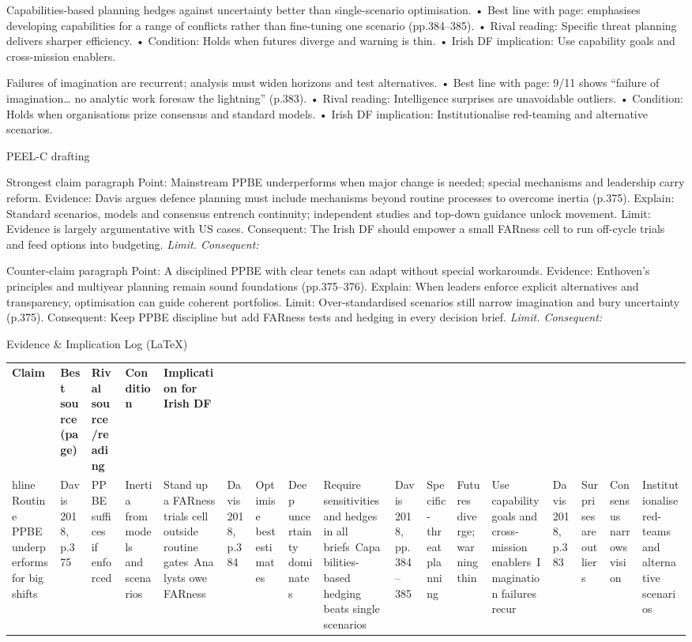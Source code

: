 Capabilities-based planning hedges against uncertainty better than single-scenario optimisation.
• Best line with page: emphasises developing capabilities for a range of conflicts rather than fine-tuning one scenario (pp.384–385).
• Rival reading: Specific threat planning delivers sharper efficiency.
• Condition: Holds when futures diverge and warning is thin.
• Irish DF implication: Use capability goals and cross-mission enablers.

Failures of imagination are recurrent; analysis must widen horizons and test alternatives.
• Best line with page: 9/11 shows “failure of imagination… no analytic work foresaw the lightning” (p.383).
• Rival reading: Intelligence surprises are unavoidable outliers.
• Condition: Holds when organisations prize consensus and standard models.
• Irish DF implication: Institutionalise red-teaming and alternative scenarios.

PEEL-C drafting

Strongest claim paragraph
Point: Mainstream PPBE underperforms when major change is needed; special mechanisms and leadership carry reform.
Evidence: Davis argues defence planning must include mechanisms beyond routine processes to overcome inertia (p.375).
Explain: Standard scenarios, models and consensus entrench continuity; independent studies and top-down guidance unlock movement.
Limit: Evidence is largely argumentative with US cases.
Consequent: The Irish DF should empower a small FARness cell to run off-cycle trials and feed options into budgeting. \textit{Limit. Consequent:}

Counter-claim paragraph
Point: A disciplined PPBE with clear tenets can adapt without special workarounds.
Evidence: Enthoven’s principles and multiyear planning remain sound foundations (pp.375–376).
Explain: When leaders enforce explicit alternatives and transparency, optimisation can guide coherent portfolios.
Limit: Over-standardised scenarios still narrow imagination and bury uncertainty (p.375).
Consequent: Keep PPBE discipline but add FARness tests and hedging in every decision brief. \textit{Limit. Consequent:}

Evidence & Implication Log (LaTeX)

\usepackage{array}
\begin{tabular}{p{3.2cm}p{4.2cm}p{3.6cm}p{3.2cm}p{4.2cm}}
	\textbf{Claim} & \textbf{Best source (page)} & \textbf{Rival source/reading} & \textbf{Condition} & \textbf{Implication for Irish DF}\\hline
	Routine PPBE underperforms for big shifts & Davis 2018, p.375 & PPBE suffices if enforced & Inertia from models and scenarios & Stand up a FARness trials cell outside routine gates\
	Analysts owe FARness & Davis 2018, p.384 & Optimise best estimates & Deep uncertainty dominates & Require sensitivities and hedges in all briefs\
	Capabilities-based hedging beats single scenarios & Davis 2018, pp.384–385 & Specific-threat planning & Futures diverge; warning thin & Use capability goals and cross-mission enablers\
	Imagination failures recur & Davis 2018, p.383 & Surprises are outliers & Consensus narrows vision & Institutionalise red-teams and alternative scenarios\
\end{tabular}

